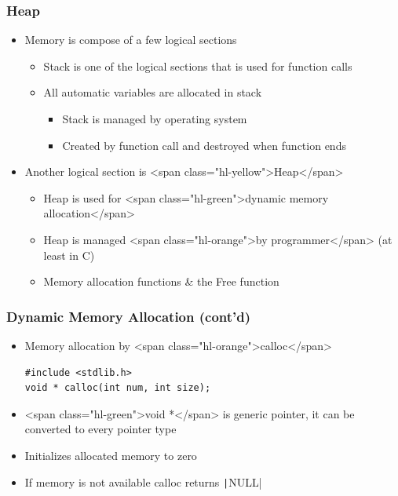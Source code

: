 \documentclass{../c-lecture}
\begin{document}
\begin{frame}
  \frametitle{Heap}
  \begin{itemize}
    \item Memory is compose of a few logical sections
    \begin{itemize}
      \item
        Stack is one of the logical sections that is used for function calls

      \item All automatic variables are allocated in stack
      \begin{itemize}
        \item Stack is managed by operating system
        \item Created by function call and destroyed when function ends
      \end{itemize}
    \end{itemize}
    \item Another logical section is <span class="hl-yellow">Heap</span>
    \begin{itemize}
      \item
        Heap is used for <span class="hl-green">dynamic memory allocation</span>

      \item
        Heap is managed <span class="hl-orange">by programmer</span> (at least
        in C)

      \item Memory allocation functions \& the Free function
    \end{itemize}
  \end{itemize}
\end{frame}

\begin{frame}[fragile]
  \frametitle{Dynamic Memory Allocation (cont’d)}
  \begin{itemize}
    \item Memory allocation by <span class="hl-orange">calloc</span>
    \begin{verbatim}
#include <stdlib.h>
void * calloc(int num, int size);
    \end{verbatim}
    \item
      <span class="hl-green">void *</span> is generic pointer, it can be
      converted to every pointer type

    \item Initializes allocated memory to zero
    \item If memory is not available calloc returns \texttt|NULL|
  \end{itemize}
\end{frame}
\end{document}
